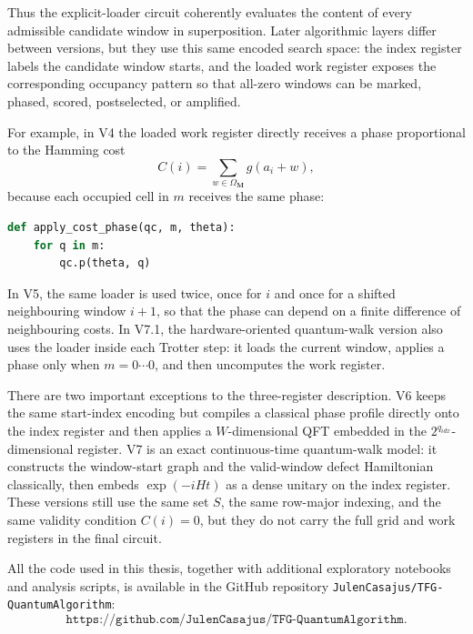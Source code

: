 Thus the explicit-loader circuit coherently evaluates the content of every admissible candidate window in superposition.  Later algorithmic layers differ between versions, but they use this same encoded search space: the index register labels the candidate window starts, and the loaded work register exposes the corresponding occupancy pattern so that all-zero windows can be marked, phased, scored, postselected, or amplified.

For example, in V4 the loaded work register directly receives a phase proportional to the Hamming cost
\[
    C(i)
    =
    \sum_{w\in\Omega_{\mathbf M}}
    g(a_i+w),
\]
because each occupied cell in \(m\) receives the same phase:

\begin{lstlisting}[language=Python, caption={V4 cost phase after loading the window.}]
def apply_cost_phase(qc, m, theta):
    for q in m:
        qc.p(theta, q)
\end{lstlisting}

In V5, the same loader is used twice, once for \(i\) and once for a shifted neighbouring window \(i+1\), so that the phase can depend on a finite difference of neighbouring costs.  In V7.1, the hardware-oriented quantum-walk version also uses the loader inside each Trotter step: it loads the current window, applies a phase only when \(m=0\cdots0\), and then uncomputes the work register.

There are two important exceptions to the three-register description.  V6 keeps the same start-index encoding but compiles a classical phase profile directly onto the index register and then applies a \(W\)-dimensional QFT embedded in the \(2^{q_{idx}}\)-dimensional register.  V7 is an exact continuous-time quantum-walk model: it constructs the window-start graph and the valid-window defect Hamiltonian classically, then embeds \(\exp(-iHt)\) as a dense unitary on the index register.  These versions still use the same set \(S\), the same row-major indexing, and the same validity condition \(C(i)=0\), but they do not carry the full grid and work registers in the final circuit.

All the code used in this thesis, together with additional exploratory notebooks and analysis scripts, is available in the GitHub repository \texttt{JulenCasajus/TFG-QuantumAlgorithm}:
\[
    \texttt{https://github.com/JulenCasajus/TFG-QuantumAlgorithm}.
\]
